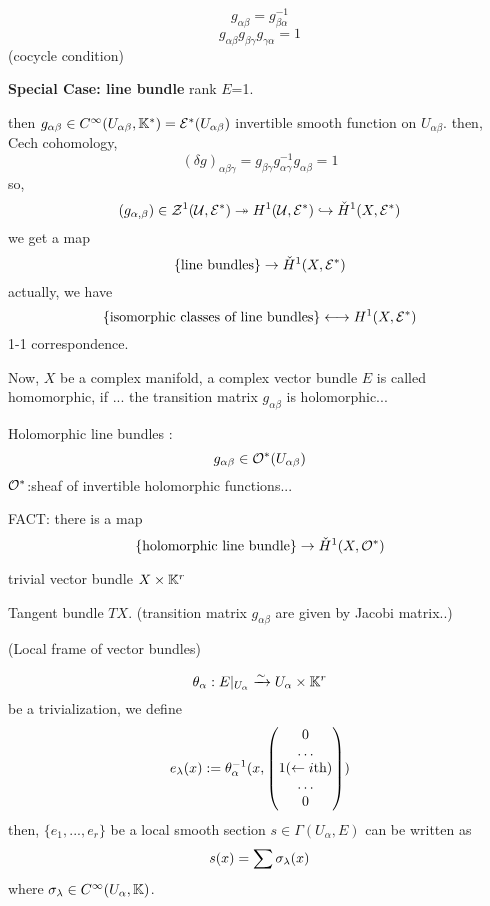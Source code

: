 \begin{rem}
$$g_{\alpha\beta}=g_{\beta\alpha}^{-1}$$
$$g_{\alpha\beta}g_{\beta\gamma}g_{\gamma\alpha}=1$$
(cocycle condition)
\end{rem}

\textbf{Special Case: line bundle}
rank $E$=1.

then $g_{\alpha\beta}\in C^{\infty}(U_{\alpha\beta},\mathbb{K}^*)=\mathcal{E}^*(U_{\alpha\beta})$
invertible smooth function on $U_{\alpha\beta}$.
then, Cech cohomology,
$$(\delta g)_{\alpha\beta\gamma}=g_{\beta\gamma}g_{\alpha\gamma}^{-1}g_{\alpha\beta}=1$$
so,
$$(g_{\alpha,\beta})\in\mathcal{Z}^1(\mathcal{U},\mathcal{E}^*)
\twoheadrightarrow H^1(\mathcal{U},\mathcal{E}^*)\hookrightarrow\check{H}^1(X,\mathcal{E}^*)$$
we get a map
$$\{\text{line bundles}\}\to \check{H}^1(X,\mathcal{E}^*)$$
actually, we have
$$\{\text{isomorphic classes of line bundles}\}
\longleftrightarrow H^1(X,\mathcal{E}^*)$$
1-1 correspondence.

Now, $X$ be a complex manifold,
a complex vector bundle $E$ is called homomorphic,
if ... the transition matrix $g_{\alpha\beta}$ is holomorphic...

Holomorphic line bundles :
$$g_{\alpha\beta}\in\mathcal{O}^*(U_{\alpha\beta})$$
$\mathcal{O}^*$:sheaf of invertible holomorphic functions...

FACT: there is a map
$$\{\text{holomorphic line bundle}\}\to\check{H}^1(X,\mathcal{O}^*)$$

\begin{example}trivial vector bundle $X\times\mathbb{K}^r$
\end{example}

\begin{example}Tangent bundle $TX$.
(transition matrix $g_{\alpha\beta}$ are given by Jacobi matrix..)
\end{example}

\begin{definition}(Local frame of vector bundles)

$$\theta_{\alpha}:E|_{U_{\alpha}}\xrightarrow{\sim} U_{\alpha}\times\mathbb{K}^r$$
be a trivialization, we define
$$
  e_{\lambda}(x):=
  \theta_{\alpha}^{-1}
  (x,\begin{pmatrix}
       0\\
       \ldots\\
       1(\leftarrow i\text{th})\\
       \ldots\\
       0
     \end{pmatrix})
$$
then, $\{e_1,...,e_r\}$ be a local smooth section
$s\in\Gamma(U_{\alpha},E)$ can be written as
$$s(x)=\sum\sigma_{\lambda}(x)$$
where $\sigma_{\lambda}\in C^{\infty}(U_\alpha,\mathbb{K})$.
\end{definition}

